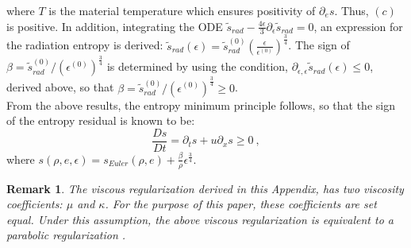 \documentclass[review]{elsarticle}
\newtheorem{remark}{Remark}[section]
\begin{document}
\begin{appendices}
 where $T$ is the material temperature which ensures positivity of $\partial_e s$. Thus, $(c)$ is positive. In addition, integrating the ODE $\tilde{s}_{rad} - \frac{4\epsilon}{3} \partial_{\epsilon} \tilde{s}_{rad} = 0$, an expression for the radiation entropy is derived: $\tilde{s}_{rad}(\epsilon)  = \tilde{s}_{rad}^{(0)} \left(\frac{\epsilon}{\epsilon^{(0)}}\right)^\frac{3}{4}$. The sign of $\beta = \tilde{s}_{rad}^{(0)} / \left(\epsilon^{(0)}\right)^\frac{3}{4}$ is determined by using the condition, $\partial_{\epsilon,\epsilon} \tilde{s}_{rad}(\epsilon) \leq 0$, derived above, so that $\beta = \tilde{s}_{rad}^{(0)} / \left(\epsilon^{(0)}\right)^\frac{3}{4}\geq0$.\\
From the above results, the entropy minimum principle follows, so that the sign of the entropy residual is known to be:
\begin{equation}
\boxed{\frac{Ds}{Dt} = \partial_t s + u \partial_x s \geq 0} \ ,
\end{equation}
where $s\left( \rho, e, \epsilon \right) = s_{Euler}( \rho, e) + \frac{\beta}{\rho} \epsilon^\frac{3}{4}$. %
\begin{remark}
The viscous regularization derived in this Appendix, has two viscosity coefficients: $\mu$ and $\kappa$. For the purpose of this paper, these coefficients are set equal. Under this assumption, the above viscous regularization is equivalent to a parabolic regularization  \cite{Parabolic}.
\end{remark}


\end{appendices}
\end{document}
